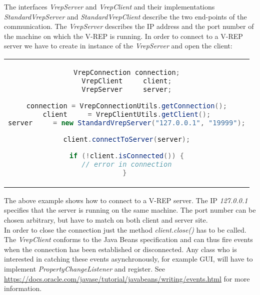The interfaces \textit{VrepServer} and \textit{VrepClient} and their implementations \textit{StandardVrepServer} and \textit{StandardVrepClient} describe the two end-points of the communication. The \textit{VrepServer} describes the IP address and the port number of the machine on which the V-REP is running. In order to connect to a V-REP server we have to create in instance of the \textit{VrepServer} and open the client:

\begin{center}
\begin{tabular}{c}
\begin{lstlisting}[basicstyle=\small, language=Java]
VrepConnection connection;
VrepClient     client;
VrepServer     server;

connection = VrepConnectionUtils.getConnection();
client     = VrepClientUtils.getClient();
server     = new StandardVrepServer("127.0.0.1", "19999");

client.connectToServer(server);

if (!client.isConnected()) {
// error in connection
} 
\end{lstlisting}
\end{tabular}
\end{center}

The above example shows how to connect to a V-REP server. The IP \textit{127.0.0.1} specifies that the server is running on the same machine. The port number can be chosen arbitrary, but have to match on both client and server site.\\
In order to close the connection just the method \textit{client.close()} has to be called. \\

The \textit{VrepClient} conforms to the Java Beans specification and can thus fire events when the connection has been established or disconnected. Any class who is interested in catching these events asynchronously, for example \gls{GUI}, will have to implement \textit{PropertyChangeListener} and register. See
\url{https://docs.oracle.com/javase/tutorial/javabeans/writing/events.html} for more information. \\

